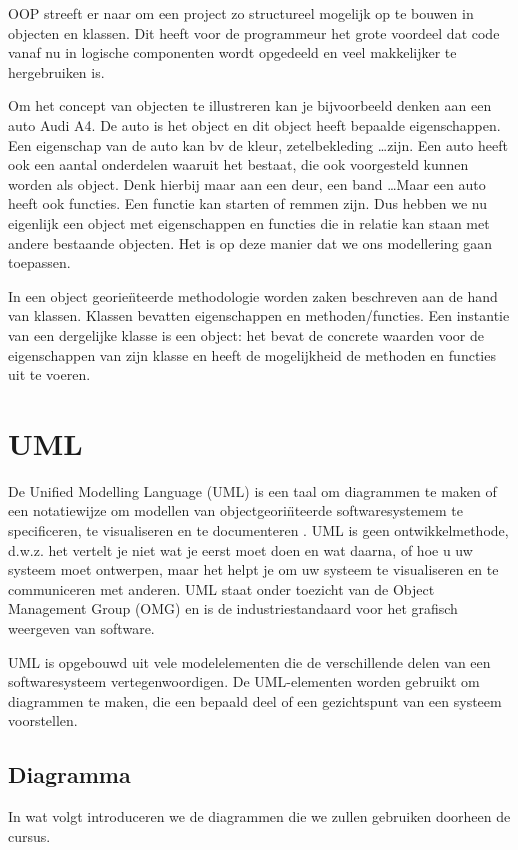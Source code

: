 OOP streeft er naar om een project zo structureel mogelijk op te bouwen in objecten en klassen. Dit heeft voor de programmeur het grote voordeel dat code vanaf nu in logische componenten wordt opgedeeld en veel makkelijker te hergebruiken is.

Om het concept van objecten te illustreren kan je bijvoorbeeld denken aan een auto Audi A4. De auto is het object en dit object heeft bepaalde eigenschappen. Een eigenschap van de auto kan bv de kleur, zetelbekleding \dots zijn. Een auto heeft ook een aantal onderdelen waaruit het bestaat, die ook voorgesteld kunnen worden als object. Denk hierbij maar aan een deur, een band \dots Maar een auto heeft ook functies. Een functie kan starten of remmen zijn. Dus hebben we nu eigenlijk een object met eigenschappen en functies die in relatie kan staan met andere bestaande objecten. Het is op deze manier dat we ons modellering gaan toepassen. 

\begin{definition}
	In een object georie\"nteerde methodologie worden zaken beschreven aan de hand van klassen. Klassen bevatten eigenschappen en methoden/functies. Een instantie van een dergelijke klasse is een object: het bevat de concrete waarden voor de eigenschappen van zijn klasse en heeft de mogelijkheid de methoden en functies uit te voeren.
\end{definition}



\section{UML}
De Unified Modelling Language (UML) is een taal om diagrammen te maken of een notatiewijze om modellen van objectgeori\"nteerde softwaresystemem te specificeren, te visualiseren en te documenteren \cite{Hensgen2003}. UML is geen ontwikkelmethode, d.w.z. het vertelt je niet wat je eerst moet doen en wat daarna, of hoe u uw systeem moet ontwerpen, maar het helpt je om uw systeem te visualiseren en te communiceren met anderen. UML staat onder toezicht van de Object Management Group (OMG) en is de industriestandaard voor het grafisch weergeven van software. 

UML is opgebouwd uit vele modelelementen die de verschillende delen van een softwaresysteem vertegenwoordigen. De UML-elementen worden gebruikt om diagrammen te maken, die een bepaald deel of een gezichtspunt van een systeem voorstellen. 

\subsection{Diagramma}
In wat volgt introduceren we de diagrammen die we zullen gebruiken doorheen de cursus.
